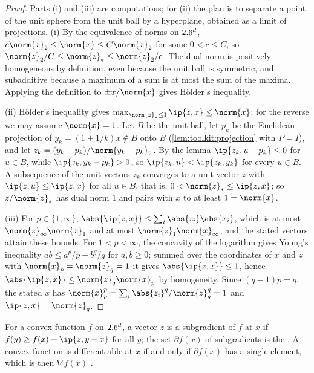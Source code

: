 \begin{refsection}
\begin{proof}
Parts (i) and (iii) are computations; for (ii) the plan is to separate a point of the unit sphere from the unit ball by a hyperplane, obtained as a limit of projections. (i) By the equivalence of norms on $2.6^d$, $c\norm{x}_2\le\norm{x}\le C\norm{x}_2$ for some $0<c\le C$, so $\norm{z}_2/C\le\norm{z}_*\le\norm{z}_2/c$. The dual norm is positively homogeneous by definition, even because the unit ball is symmetric, and subadditive because a maximum of a sum is at most the sum of the maxima. Applying the definition to $\pm x/\norm{x}$ gives H\"older's inequality.

(ii) H\"older's inequality gives $\max_{\norm{z}_*\le1}\ip{z,x}\le\norm{x}$; for the reverse we may assume $\norm{x}=1$. Let $B$ be the unit ball, let $p_k$ be the Euclidean projection of $y_k=(1+1/k)x\notin B$ onto $B$ (\cref{lem:toolkit:projection} with $P=I$), and let $z_k=(y_k-p_k)/\norm{y_k-p_k}_2$. By the lemma $\ip{z_k,u-p_k}\le0$ for $u\in B$, while $\ip{z_k,y_k-p_k}>0$, so $\ip{z_k,u}<\ip{z_k,y_k}$ for every $u\in B$. A subsequence of the unit vectors $z_k$ converges to a unit vector $z$ with $\ip{z,u}\le\ip{z,x}$ for all $u\in B$, that is, $0<\norm{z}_*\le\ip{z,x}$; so $z/\norm{z}_*$ has dual norm $1$ and pairs with $x$ to at least $1=\norm{x}$.

(iii) For $p\in\{1,\infty\}$, $\abs{\ip{z,x}}\le\sum_i\abs{z_i}\abs{x_i}$, which is at most $\norm{z}_\infty\norm{x}_1$ and at most $\norm{z}_1\norm{x}_\infty$, and the stated vectors attain these bounds. For $1<p<\infty$, the concavity of the logarithm gives Young's inequality $ab\le a^p/p+b^q/q$ for $a,b\ge0$; summed over the coordinates of $x$ and $z$ with $\norm{x}_p=\norm{z}_q=1$ it gives $\abs{\ip{z,x}}\le1$, hence $\abs{\ip{z,x}}\le\norm{z}_q\norm{x}_p$ by homogeneity. Since $(q-1)p=q$, the stated $x$ has $\norm{x}_p^p=\sum_i\abs{z_i}^q/\norm{z}_q^q=1$ and $\ip{z,x}=\norm{z}_q$.
\end{proof}

For a convex function $f$ on $2.6^d$, a vector $z$ is a subgradient of $f$ at $x$ if $f(y)\ge f(x)+\ip{z,y-x}$ for all $y$; the set $\partial f(x)$ of subgradients is the . A convex function is differentiable at $x$ if and only if $\partial f(x)$ has a single element, which is then $\nabla f(x)$ \parencite[Section~25]{Rockafellar1970}.


\end{refsection}
